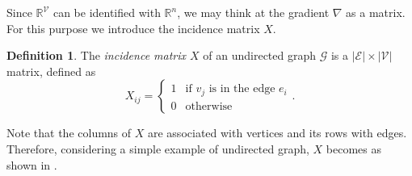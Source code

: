 \documentclass[12pt,a4paper]{report}
\theoremstyle{definition}
\newtheorem{definition}{Definition}[chapter]
\begin{document}
Since $\mathbb{R}^{\mathcal{V}}$ can be identified with $\mathbb{R}^n$, we may think at the gradient $\nabla$ as a matrix.
For this purpose we introduce the incidence matrix $X$.
\begin{definition}
The \emph{incidence matrix $X$} of an undirected graph $\mathcal{G}$ is a $|\mathcal{E}|\times|\mathcal{V}|$ matrix, defined as 
\begin{equation*}
    X_{ij} = 
    \begin{cases}
    1 & \text{if $v_j$ is in the edge $e_i$} \\
    0 & \text{otherwise}
    \end{cases}.
\end{equation*}
\end{definition}
Note that the columns of $X$ are associated with vertices and its rows with edges.
Therefore, considering a simple example of undirected graph, $X$ becomes as shown in .
\end{document}
